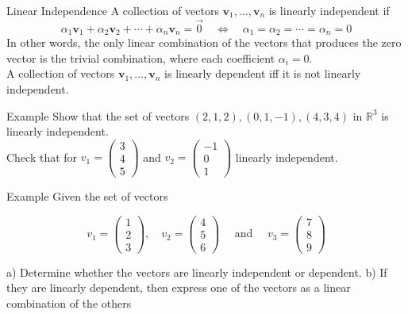 \documentclass[11pt]{beamer}
\theoremstyle{plain}
\begin{document}
\begin{frame}{Linear Independence}
A collection of vectors $\mathbf{v}_1, \ldots, \mathbf{v}_n$ is linearly independent if
$$
\alpha_1 \mathbf{v}_1+\alpha_2 \mathbf{v}_2+\cdots+\alpha_n \mathbf{v}_n=\vec0 \quad \Longleftrightarrow \quad \alpha_1=\alpha_2=\cdots=\alpha_n=0
$$
In other words, the only linear combination of the vectors that produces the zero vector is the trivial combination, where each coefficient $\alpha_i=0$.\\
A collection of vectors $\mathbf{v}_1, \ldots, \mathbf{v}_n$ is linearly dependent iff it is not linearly independent.
\end{frame}

\begin{frame}{Example}
    Show that the set of vectors ${(2,1,2),(0,1,-1),(4,3,4)}$ in $\mathbb R^3$ is linearly independent.\\
    Check that for $v_1=\begin{pmatrix}
        3\\4\\5
    \end{pmatrix}$ and $v_2=\begin{pmatrix}
        -1\\0\\1
    \end{pmatrix}$ linearly independent. 
\end{frame}

\begin{frame}{Example}
    Given the set of vectors

$$
v_1=\left(\begin{array}{l}
1 \\
2 \\
3
\end{array}\right), \quad v_2=\left(\begin{array}{l}
4 \\
5 \\
6
\end{array}\right) \quad \text { and } \quad v_3=\left(\begin{array}{l}
7 \\
8 \\
9
\end{array}\right)
$$

a) Determine whether the vectors are linearly independent or dependent.
b) If they are linearly dependent, then express one of the vectors as a linear combination of the others
\end{frame}
\end{document}
